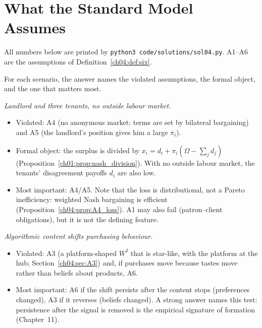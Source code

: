 \documentclass[../solutions_manual.tex]{subfiles}
\begin{document}
\ifSubfilesClassLoaded{\setcounter{chapter}{3}}{}%
\setcounter{chapter}{3}%
\chapter{What the Standard Model Assumes}\label{sol04}
\sloppy

All numbers below are printed by \texttt{python3 code/solutions/sol04.py}. A1--A6 are the assumptions of Definition~\ref{ch04:def:six}.


For each scenario, the answer names the violated assumptions, the formal object, and the one that matters most.

 \emph{Landlord and three tenants, no outside labour market.}
\begin{itemize}
\item Violated: A4 (no anonymous market; terms are set by bilateral bargaining) and A5 (the landlord's position gives him a large $\pi_i$).
\item Formal object: the surplus is divided by $x_i = d_i + \pi_i(\Omega - \sum_jd_j)$ (Proposition~\ref{ch01:prop:nash_division}). With no outside labour market, the tenants' disagreement payoffs $d_i$ are also low.
\item Most important: A4/A5. Note that the loss is distributional, not a Pareto inefficiency: weighted Nash bargaining is efficient (Proposition~\ref{ch04:prop:A4_loss}). A1 may also fail (patron--client obligations), but it is not the defining feature.
\end{itemize}

 \emph{Algorithmic content shifts purchasing behaviour.}
\begin{itemize}
\item Violated: A3 (a platform-shaped $W^I$ that is star-like, with the platform at the hub; Section~\ref{ch04:sec:A3}) and, if purchases move because tastes move rather than beliefs about products, A6.
\item Most important: A6 if the shift persists after the content stops (preferences changed), A3 if it reverses (beliefs changed). A strong answer names this test: persistence after the signal is removed is the empirical signature of formation (Chapter~11).
\end{itemize}
\end{document}

